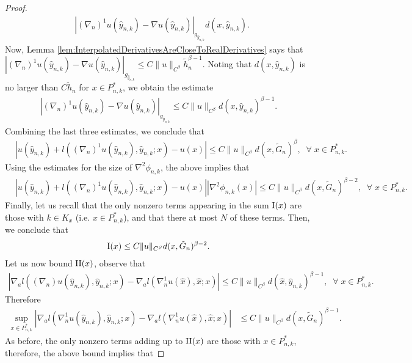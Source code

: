 \documentclass[11pt,reqno]{amsart}
\numberwithin{equation}{section}
\theoremstyle{plain}
\begin{document}
\begin{proof}
  \begin{align*}	
    & |(\nabla_n)^1u (\hat y_{n,k})- \nabla u (\hat y_{n,k})|_{g_{\hat y_{n,k}}}d(x,\hat y_{n,k}).	 
  \end{align*}
  Now, Lemma \ref{lem:InterpolatedDerivativesAreCloseToRealDerivatives} says that $|(\nabla_n)^1u (\hat y_{n,k})- \nabla u (\hat y_{n,k})|_{g_{\hat y_{n,k}}} \leq C\|u\|_{C^\beta}\tilde h_n^{\beta-1}$. Noting that $d(x,\hat y_{n,k})$ is no larger than $C\tilde h_n$ for $x\in P_{n,k}^*$, we obtain the estimate
  \begin{align*}
    |(\nabla_n)^1u (\hat y_{n,k})- \nabla u (\hat y_{n,k})|_{g_{\hat y_{n,k}}} \leq C\|u\|_{C^\beta}d(x,\hat y_{n,k})^{\beta-1}.	  
  \end{align*}	  
  Combining the last three estimates, we conclude that  
  \begin{align*}
    & |u(\hat y_{n,k})+l( (\nabla_n)^1u (\hat y_{n,k}),\hat y_{n,k};x)-u(x)|\leq C\|u\|_{C^\beta}d(x, \tilde G_n)^\beta,\;\;\forall\;x\in P_{n,k}^*.
  \end{align*}
  Using the estimates for the size of $\nabla^2\phi_{n,k}$, the above implies that
  \begin{align*}
    & |u(\hat y_{n,k})+l( (\nabla_n)^1u (\hat y_{n,k}),\hat y_{n,k};x)-u(x)||\nabla^2\phi_{n,k}(x)| \leq C\|u\|_{C^\beta}d(x,\tilde G_n)^{\beta-2},\;\;\forall\;x\in P_{n,k}^*.
  \end{align*}
  Finally, let us recall that the only nonzero terms appearing in the sum $\textnormal{I}(x)$ are those with $k\in K_x$ (i.e. $x \in P_{n,k}^*$), and that there at most $N$ of these terms. Then, we conclude that
  \begin{align*}
    \textnormal{I}(x) \leq C\|u\|_{C^\beta}d(x,\tilde G_n)^{\beta-2}.
  \end{align*}
  Let us now bound $\textnormal{II}(x)$, observe that	
  \begin{align*}
    \left | \nabla_a l( (\nabla_n)u (\hat y_{n,k}),\hat y_{n,k};x)-\nabla_a l( \nabla^1_n u (\hat x),\hat x;x)\right | \leq C\|u\|_{C^\beta}d(\hat x,\hat y_{n,k})^{\beta-1},\;\;\forall\;x\in P_{n,k}^*.
  \end{align*}
  Therefore
  \begin{align*}
    \sup \limits_{x\in P_{n,k}^*}\left | \nabla_a l( \nabla^1_n u (\hat y_{n,k}),\hat y_{n,k};x)-\nabla_a l( \nabla^1_n u (\hat x),\hat x;x)\right | & \leq C\|u\|_{C^\beta}d(x,\tilde G_n)^{\beta-1}.
  \end{align*}	 
  As before, the only nonzero terms adding up to $\textnormal{II}(x)$ are those with $x \in P_{n,k}^*$, therefore, the above bound implies that

\end{proof}
\end{document}
